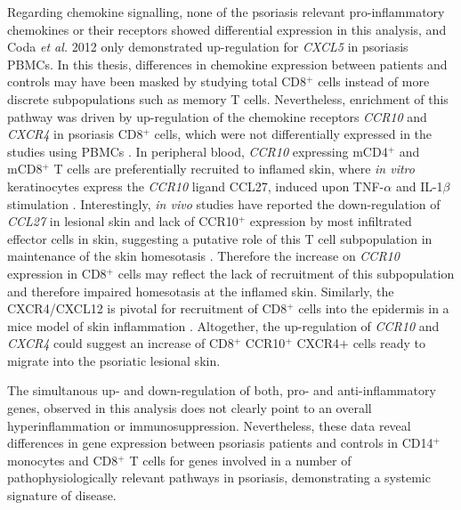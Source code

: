 Regarding chemokine signalling, none of the psoriasis relevant pro-inflammatory chemokines or their receptors showed differential expression in this analysis, and Coda \textit{et al.} 2012 only demonstrated up-regulation for \textit{CXCL5} in psoriasis PBMCs. In this thesis, differences in chemokine expression between patients and controls may have been masked by studying total CD8$^+$ cells instead of more discrete subpopulations such as memory T cells. Nevertheless, enrichment of this pathway was driven by up-regulation of the chemokine receptors \textit{CCR10} and \textit{CXCR4} in psoriasis CD8$^+$ cells, which were not differentially expressed in the studies using PBMCs \parencite{Coda2012,Lee2009,Mesko2010}. In peripheral blood, \textit{CCR10} expressing mCD4$^+$ and mCD8$^+$ T cells are preferentially recruited to inflamed skin, where \textit{in vitro} keratinocytes express the \textit{CCR10} ligand CCL27, induced upon TNF-$\alpha$ and IL-1$\beta$ stimulation \parencite{Hudak2002,Homey2002}. Interestingly, \textit{in vivo} studies have reported the down-regulation of \textit{CCL27} in lesional skin and lack of CCR10$^+$ expression by most infiltrated effector cells in skin, suggesting a putative role of this T cell subpopulation in maintenance of the skin homesotasis \parencite{Sahmatova2017,Yang2016a}. Therefore the increase on \textit{CCR10} expression in CD8$^+$ cells may reflect the lack of recruitment of this subpopulation and therefore impaired homesotasis at the inflamed skin. Similarly, the CXCR4/CXCL12 is pivotal for recruitment of CD8$^+$ cells into the epidermis in a mice model of skin inflammation \parencite{Zgraggen2014}. Altogether, the up-regulation of \textit{CCR10} and \textit{CXCR4} could suggest an increase of CD8$^+$ CCR10$^+$ CXCR4$+$ cells ready to migrate into the psoriatic lesional skin. 

The simultanous up- and down-regulation of both, pro- and anti-inflammatory genes, observed in this analysis does not clearly point to an overall hyperinflammation or immunosuppression. Nevertheless, these data reveal differences in gene expression between psoriasis patients and controls in CD14$^+$ monocytes and CD8$^+$ T cells for genes involved in a number of pathophysiologically relevant pathways in psoriasis, demonstrating a systemic signature of disease.



